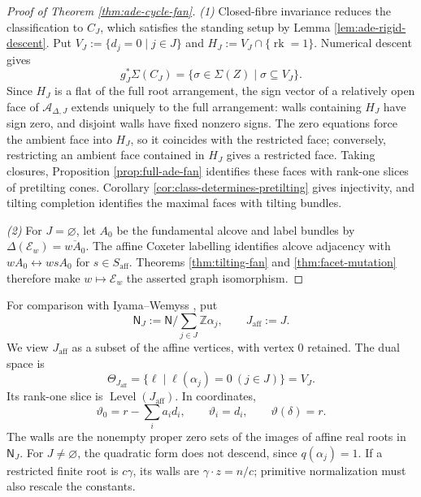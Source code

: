 \documentclass[a4paper,reqno]{amsart}
\def\E{\mathcal{E}}
\DeclareMathOperator{\rk}{rk}
\theoremstyle{definition}
\begin{document}
\begin{proof}[Proof of Theorem \ref{thm:ade-cycle-fan}]
\emph{(1)} Closed-fibre invariance reduces the classification to $C_J$, which satisfies the standing setup by Lemma \ref{lem:ade-rigid-descent}. Put $V_J:=\{d_j=0\mid j\in J\}$ and $H_J:=V_J\cap\{\rk=1\}$. Numerical descent gives
\begin{equation}\label{eq:ade-fan-restriction}
g_J^*\Sigma(C_J)=\{\sigma\in\Sigma(Z)\mid\sigma\subseteq V_J\}.
\end{equation}
Since $H_J$ is a flat of the full root arrangement, the sign vector of a relatively open face of $\mathscr A_{\Delta,J}$ extends uniquely to the full arrangement: walls containing $H_J$ have sign zero, and disjoint walls have fixed nonzero signs. The zero equations force the ambient face into $H_J$, so it coincides with the restricted face; conversely, restricting an ambient face contained in $H_J$ gives a restricted face. Taking closures, Proposition \ref{prop:full-ade-fan} identifies these faces with rank-one slices of pretilting cones. Corollary \ref{cor:class-determines-pretilting} gives injectivity, and tilting completion identifies the maximal faces with tilting bundles.

\emph{(2)} For $J=\varnothing$, let $A_0$ be the fundamental alcove and label bundles by $\Delta(\E_w)=\overline{wA_0}$. The affine Coxeter labelling \cite[Theorems 1.12 and 1.20, Proposition 2.7]{IWTC} identifies alcove adjacency with $wA_0\longleftrightarrow wsA_0$ for $s\in S_{\mathrm{aff}}$. Theorems \ref{thm:tilting-fan} and \ref{thm:facet-mutation} therefore make $w\mapsto\E_w$ the asserted graph isomorphism.
\end{proof}

For comparison with Iyama--Wemyss \cite[Definitions 2.5--2.6 and Proposition 2.7]{IWTC}, put
\[
\mathsf N_J:=\mathsf N/\sum_{j\in J}\mathbb Z\alpha_j,\qquad J_{\mathrm{aff}}:=J.
\]
We view $J_{\mathrm{aff}}$ as a subset of the affine vertices, with vertex $0$ retained. The dual space is
\[
\Theta_{J_{\mathrm{aff}}}=\{\ell\mid\ell(\alpha_j)=0\ (j\in J)\}=V_J.
\]
Its rank-one slice is $\operatorname{Level}(J_{\mathrm{aff}})$. In coordinates,
\[
\vartheta_0=r-\sum_i a_id_i,\qquad \vartheta_i=d_i,\qquad
\vartheta(\delta)=r.
\]
The walls are the nonempty proper zero sets of the images of affine real roots in $\mathsf N_J$. For $J\ne\varnothing$, the quadratic form does not descend, since $q(\alpha_j)=1$. If a restricted finite root is $c\gamma$, its walls are $\gamma\cdot z=n/c$; primitive normalization must also rescale the constants.
\end{document}
